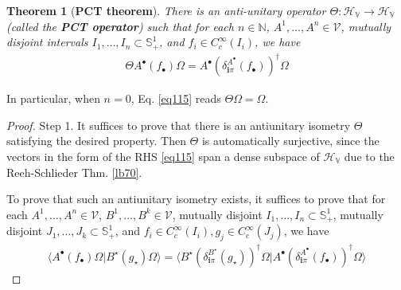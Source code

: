\documentclass[12pt,b5paper,notitlepage]{article}
\theoremstyle{definition}
\theoremstyle{plain}
\newtheorem{thm}[df]{Theorem}
\newcommand{\bk}[1]{\langle {#1}\rangle}
\newcommand{\im}{\mathbf{i}}
\newcommand{\blt}{\bullet}
\newcommand{\Nbb}{\mathbb N}
\newcommand{\Sbb}{{\mathbb S}}
\newcommand{\HV}{\mathcal H_{\mathbb V}}
\newcommand{\MV}{\mathcal V}
\numberwithin{equation}{section}
\begin{document}
\begin{thm}[\textbf{PCT theorem}]\label{lb86}
There is an anti-unitary operator $\Theta:\HV\rightarrow\HV$ (called the \textbf{PCT operator})  such that for each $n\in\Nbb$, $A^1,\dots,A^n\in\MV$, mutually disjoint intervals $I_1,\dots,I_n\subset\Sbb^1_+$, and $f_i\in C^\infty_c(I_i)$, we have
\begin{align}\label{eq115}
\Theta A^\blt(f_\blt)\Omega=A^\blt(\delta^{A^\blt}_{\im\pi}(f_\blt))^\dagger\Omega
\end{align}
\end{thm}

In particular, when $n=0$, Eq. \eqref{eq115} reads $\Theta\Omega=\Omega$.

\begin{proof}
Step 1. It suffices to prove that there is an antiunitary isometry $\Theta$ satisfying the desired property. Then $\Theta$ is automatically surjective, since the vectors in the form of the RHS \eqref{eq115} span a dense subspace of $\HV$ due to the Reeh-Schlieder Thm. \ref{lb70}.

To prove that such an antiunitary isometry exists, it suffices to prove that for each $A^1,\dots,A^n\in\MV$, $B^1,\dots,B^k\in\MV$, mutually disjoint $I_1,\dots,I_n\subset\Sbb^1_+$, mutually disjoint $J_1,\dots,J_k\subset\Sbb^1_+$, and $f_i\in C_c^\infty(I_i),g_j\in C_c^\infty(J_j)$, we have
\begin{align}\label{eq116}
\bk{A^\blt(f_\blt)\Omega|B^\star(g_\star)\Omega}=\bk{B^\star(\delta^{B^\star}_{\im\pi}(g_\star))^\dagger\Omega|A^\blt(\delta_{\im\pi}^{A^\blt}(f_\blt))^\dagger\Omega}
\end{align}


\end{proof}
\end{document}
